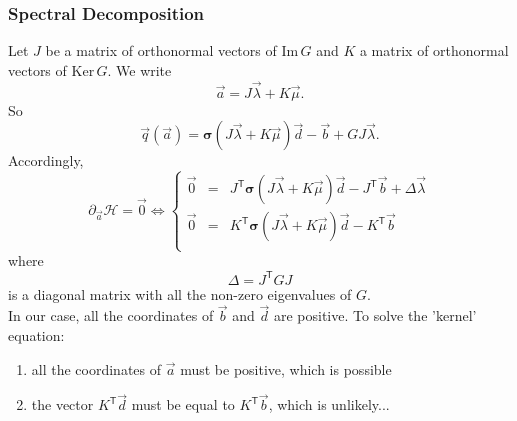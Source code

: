 \documentclass{revtex4}
\newcommand{\trn}[1]{{#1}^{\mathsf{T}}}
\begin{document}
\subsubsection{Spectral Decomposition}
Let ${J}$ be a matrix of orthonormal vectors of $\mathrm{Im}\,G$ and ${K}$ a matrix of orthonormal vectors of $\mathrm{Ker}\,G$.
We write
\begin{equation}
	\vec{a} =  {J} \vec{\lambda} +  {K} \vec{\mu}.
\end{equation}
So
\begin{equation}
	\vec{q}\left(\vec{a}\right) = \bm{\sigma}\left({J} \vec{\lambda} +  {K} \vec{\mu}\right) \vec{d} -\vec{b} + G J \vec{\lambda}.
\end{equation}
Accordingly,
\begin{equation}
\partial_{\vec{a}}\mathcal{H} = \vec{0} \Leftrightarrow
\left\lbrace
	\begin{array}{rcl}
	\vec{0} & = & \trn{J} \bm{\sigma}\left({J} \vec{\lambda} +  {K} \vec{\mu}\right) \vec{d} - \trn{J}\vec{b} + \Delta \vec{\lambda}\\
	\vec{0} & = & \trn{K} \bm{\sigma}\left({J} \vec{\lambda} +  {K} \vec{\mu}\right) \vec{d} - \trn{K}\vec{b} \\
	\end{array}
	\right.
\end{equation}
where
\begin{equation}
	\Delta = \trn{J} G J
\end{equation}
is a diagonal matrix with all the non-zero eigenvalues of $G$.\\

In our case, all the coordinates of $\vec{b}$ and $\vec{d}$ are positive. 
To solve the 'kernel' equation:
\begin{enumerate}
\item all the coordinates of $\vec{a}$ must be positive, which is possible
\item the vector $\trn{K}\vec{d}$ must be equal to $\trn{K}\vec{b}$, which is unlikely...
\end{enumerate}
\end{document}
